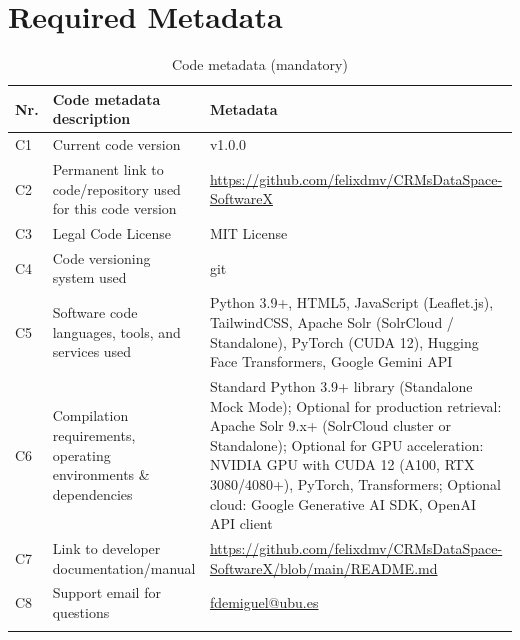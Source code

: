 \documentclass[preprint,12pt, a4paper]{elsarticle}
\begin{document}
\section*{Required Metadata}
\label{sec:Metadata}

\begin{longtable}{|l|p{6.5cm}|p{6.5cm}|}
\hline
\textbf{Nr.} & \textbf{Code metadata description} & \textbf{Metadata} \\
\hline
C1 & Current code version & v1.0.0 \\
\hline
C2 & Permanent link to code/repository used for this code version & \url{https://github.com/felixdmv/CRMsDataSpace-SoftwareX} \\
\hline
C3 & Legal Code License & MIT License \\
\hline
C4 & Code versioning system used & git \\
\hline
C5 & Software code languages, tools, and services used & Python 3.9+, HTML5, JavaScript (Leaflet.js), TailwindCSS, Apache Solr (SolrCloud / Standalone), PyTorch (CUDA 12), Hugging Face Transformers, Google Gemini API \\
\hline
C6 & Compilation requirements, operating environments \& dependencies & Standard Python 3.9+ library (Standalone Mock Mode); Optional for production retrieval: Apache Solr 9.x+ (SolrCloud cluster or Standalone); Optional for GPU acceleration: NVIDIA GPU with CUDA 12 (A100, RTX 3080/4080+), PyTorch, Transformers; Optional cloud: Google Generative AI SDK, OpenAI API client \\
\hline
C7 & Link to developer documentation/manual & \url{https://github.com/felixdmv/CRMsDataSpace-SoftwareX/blob/main/README.md} \\
\hline
C8 & Support email for questions & \href{mailto:fdemiguel@ubu.es}{fdemiguel@ubu.es} \\
\hline
\caption{Code metadata (mandatory)}
\label{tab:metadata}
\end{longtable}










\end{document}
